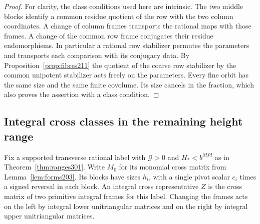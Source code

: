 \documentclass[a4paper,11pt]{article}
\theoremstyle{definition}
\theoremstyle{remark}
\numberwithin{equation}{section}
\begin{document}
\begin{proof}
For clarity, the class conditions used here are intrinsic.
The two middle blocks identify a common residue quotient of the
row with the two column coordinates. A change of column frames
transports the rational maps with those frames. A change of the
common row frame conjugates their residue endomorphisms.
In particular a rational row stabilizer permutes the parameters
and transports each comparison with its conjugacy data.
By Proposition~\ref{prop:fibres211} the quotient of the coarse
row stabilizer by the common unipotent stabilizer acts freely
on the parameters. Every fine orbit has the same size and the
same finite covolume. Its size cancels in the fraction, which
also proves the assertion with a class condition.
\end{proof}

\subsection{Integral cross classes in the remaining height range}\label{nav:IX-60}
Fix a supported transverse rational label with \(\mathcal G>0\)
and \(H_*<b^{Mfd}\) as in Theorem~\ref{thm:ranges301}. Write
\(M_0\) for its monomial cross matrix from
Lemma~\ref{lem:forms203}. Its blocks have sizes \(h_i\),
with a single pivot scalar \(c_i\) times a signed reversal
in each block. An integral cross representative \(Z\) is the
cross matrix of two primitive integral frames for this label.
Changing the frames acts on the left by integral lower
unitriangular matrices and on the right by integral upper
unitriangular matrices.
\end{document}
